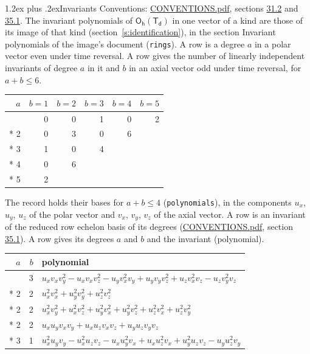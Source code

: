 \documentclass[10pt,a4paper]{article}
\makeatletter
\renewcommand\section{\@startsection{section}{1}{\z@}{-3ex plus -1ex minus -.2ex}%
  {1.2ex plus .2ex}{\normalfont\large\sffamily\bfseries\color{parttitle}}}
\numberwithin{equation}{section}
\newcommand{\grp}[1]{\mathsf{#1}}
\makeatother
\begin{document}
\section{Invariants}\label{s:invariants}
Conventions: \href{../../CONVENTIONS.pdf}{CONVENTIONS.pdf}, sections \href{../../CONVENTIONS.pdf\#conv.31.2}{31.2} and \href{../../CONVENTIONS.pdf\#conv.35.1}{35.1}.
The invariant polynomials of $\grp{O_{h}}(\grp{T_{d}})$ in one vector of a kind are those of its image of that kind (section~\ref{s:identification}), in the section Invariant polynomials of the image's document (\texttt{rings}).
\leavevmode\label{n:index.degree.polar}\label{n:index.degree.axial}A row is a degree $a$ in a polar vector even under time reversal. A row gives the number of linearly independent invariants of degree $a$ in it and $b$ in an axial vector odd under time reversal, for $a + b \le 6$.
{\small\begin{longtable}{@{}rrrrrr@{}}\toprule
$a$ & $b = 1$ & $b = 2$ & $b = 3$ & $b = 4$ & $b = 5$\\\midrule\endhead
\bottomrule\endfoot\endlastfoot
1 & 0 & 0 & 1 & 0 & 2\\*
2 & 0 & 3 & 0 & 6 & \\*
3 & 1 & 0 & 4 &  & \\*
4 & 0 & 6 &  &  & \\*
5 & 2 &  &  &  & \\
\bottomrule\end{longtable}}
\leavevmode\label{n:local.component.polar}\label{n:local.component.axial}The record holds their bases for $a + b \le 4$ (\texttt{polynomials}), in the components $u_{x}$, $u_{y}$, $u_{z}$ of the polar vector and $v_{x}$, $v_{y}$, $v_{z}$ of the axial vector. \label{n:head.polynomial}A row is an invariant of the reduced row echelon basis of its degrees (\href{../../CONVENTIONS.pdf}{CONVENTIONS.pdf}, section \href{../../CONVENTIONS.pdf\#conv.35.1}{35.1}). A row gives its degrees $a$ and $b$ and the invariant (polynomial).
{\small\renewcommand{\arraystretch}{1.2}\begin{longtable}{@{}rrl@{}}\toprule
$a$ & $b$ & polynomial\\\midrule\endhead
\bottomrule\endfoot\endlastfoot
1 & 3 & $u_{x}v_{x}v_{y}^{2} - u_{x}v_{x}v_{z}^{2} - u_{y}v_{x}^{2}v_{y} + u_{y}v_{y}v_{z}^{2} + u_{z}v_{x}^{2}v_{z} - u_{z}v_{y}^{2}v_{z}$\\*
2 & 2 & $u_{x}^{2}v_{x}^{2} + u_{y}^{2}v_{y}^{2} + u_{z}^{2}v_{z}^{2}$\\*
2 & 2 & $u_{x}^{2}v_{y}^{2} + u_{x}^{2}v_{z}^{2} + u_{y}^{2}v_{x}^{2} + u_{y}^{2}v_{z}^{2} + u_{z}^{2}v_{x}^{2} + u_{z}^{2}v_{y}^{2}$\\*
2 & 2 & $u_{x}u_{y}v_{x}v_{y} + u_{x}u_{z}v_{x}v_{z} + u_{y}u_{z}v_{y}v_{z}$\\*
3 & 1 & $u_{x}^{2}u_{y}v_{y} - u_{x}^{2}u_{z}v_{z} - u_{x}u_{y}^{2}v_{x} + u_{x}u_{z}^{2}v_{x} + u_{y}^{2}u_{z}v_{z} - u_{y}u_{z}^{2}v_{y}$\\
\bottomrule\end{longtable}}
\end{document}
